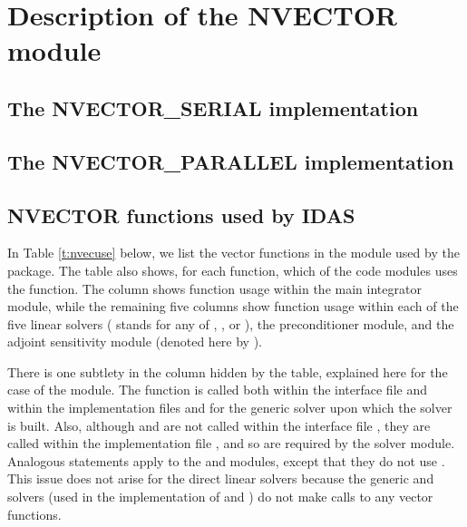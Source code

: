 \chapter{Description of the NVECTOR module}\label{s:nvector}


\section{The NVECTOR\_SERIAL implementation}\label{ss:nvec_ser}


\section{The NVECTOR\_PARALLEL implementation}\label{ss:nvec_par}


\section{NVECTOR functions used by IDAS}

In Table \ref{t:nvecuse} below, we list the vector functions in the 
{\nvector} module used by the {\idas} package.
The table also shows, for each function, which of the code modules uses
the function. The {\idas} column shows function usage within the main
integrator module, while the remaining five columns show function usage
within each of the five {\idas} linear solvers ({\idaspils} stands for any
of {\idaspgmr}, {\idaspbcg}, or {\idasptfqmr}), the {\idabbdpre}
preconditioner module, and the {\idas} adjoint sensitivity
module (denoted here by {\idaa}).

There is one subtlety in the {\idaspils} column hidden by the table, explained
here for the case of the {\idaspgmr} module. 
The  function is called both within the interface file
 and within the implementation
files  and  for the generic
{\spgmr} solver upon which the {\idaspgmr} solver is built.  Also, although
 and  are not called within the interface file
, they are called within the implementation file
, and so are required by the {\idaspgmr} solver module.
Analogous statements apply to the {\idaspbcg} and {\idasptfqmr} modules,
except that they do not use .
This issue does not arise for the direct {\idas} linear solvers because
the generic {\dense} and {\band} solvers (used in the implementation of
{\idadense} and {\idaband}) do not make calls to any vector functions.


